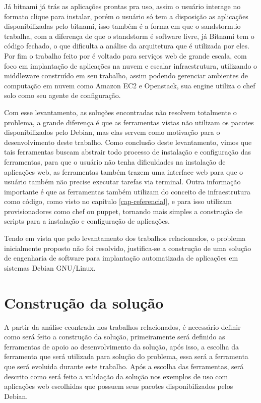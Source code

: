 Já bitnami já trás as aplicações
prontas pra uso, assim o usuário interage no formato clique para instalar, porém
o usuário só tem a disposição as aplicações disponibilizadas pelo bitnami, isso
também é a forma em que o sandstorm.io trabalha, com a diferença de que o standstorm é
software livre, já Bitnami tem o código fechado, o que dificulta a análise da arquitetura
que é utilizada por eles. Por fim o trabalho feito por \cite{leo2014} é voltado
para serviços web de grande escala, com foco em implantação de aplicações na
nuvem e escalar infraestrutura, utilizando o middleware construído em seu trabalho,
 assim podendo gerenciar ambientes de computação em nuvem
 como Amazon EC2 e Openstack, sua engine utiliza o chef solo como seu agente de configuração.

Com esse levantamento, as soluções encontradas não resolvem totalmente
o problema, a grande diferença é que as ferramentas vistas não utilizam os pacotes
disponibilizados pelo Debian, mas elas servem como motivação para o desenvolvimento
deste trabalho. Como conclusão deste levantamento, vimos que tais ferramentas buscam
abstrair todo processo de instalação e configuração das ferramentas, para que o
usuário não tenha dificuldades na instalação de aplicações web, as ferramentas também
trazem uma interface web para que o usuário também não precise executar tarefas via terminal.
Outra informação importante é que as ferramentas também utilizam do conceito de
infraestrutura como código, como visto no capítulo \ref{cap-referencial}, e para
isso utilizam provisionadores como chef ou puppet, tornando mais simples a
construção de scripts para a instalação e configuração de aplicações.

Tendo em vista que pelo levantamento dos trabalhos relacionados, o problema inicialmente
proposto não foi resolvido, justifica-se a construção de uma solução de engenharia
de software para implantação automatizada de aplicações em sistemas Debian GNU/Linux.

\section{Construção da solução}
\label{section:construcao}

A partir da análise econtrada nos trabalhos relacionados, é necessário definir
como será feito a construção da solução, primeiramente será definido as ferramentas
de apoio ao desenvolvimento da solução, após isso, a escolha da ferramenta que será
utilizada para solução do problema, essa será a ferramenta que será evoluida
durante este trabalho. Após a escolha das ferramentas, será descrito como será
feito a validação da solução nos exemplos de uso com aplicações web escolhidas que possuem
seus pacotes disponibilizados pelos Debian.

